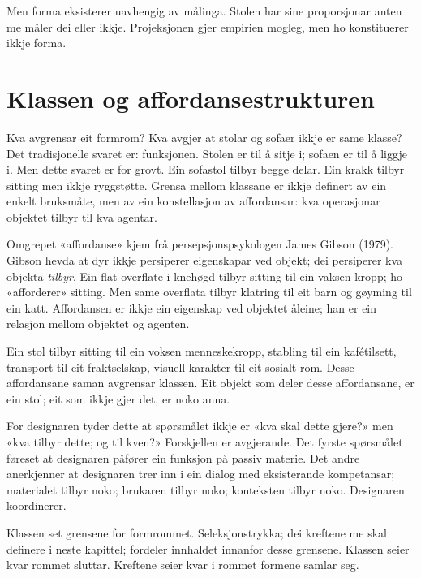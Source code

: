 Men forma eksisterer uavhengig av målinga. Stolen har sine proporsjonar anten me måler dei eller ikkje. Projeksjonen gjer empirien mogleg, men ho konstituerer ikkje forma.

\section*{Klassen og affordansestrukturen}


Kva avgrensar eit formrom? Kva avgjer at stolar og sofaer ikkje er same klasse? Det tradisjonelle svaret er: funksjonen. Stolen er til å sitje i; sofaen er til å liggje i. Men dette svaret er for grovt. Ein sofastol tilbyr begge delar. Ein krakk tilbyr sitting men ikkje ryggstøtte. Grensa mellom klassane er ikkje definert av ein enkelt bruksmåte, men av ein konstellasjon av affordansar: kva operasjonar objektet tilbyr til kva agentar.

Omgrepet «affordanse» kjem frå persepsjonspsykologen James Gibson (1979). Gibson hevda at dyr ikkje persiperer eigenskapar ved objekt; dei persiperer kva objekta \textit{tilbyr}. Ein flat overflate i knehøgd tilbyr sitting til ein vaksen kropp; ho «afforderer» sitting. Men same overflata tilbyr klatring til eit barn og gøyming til ein katt. Affordansen er ikkje ein eigenskap ved objektet åleine; han er ein relasjon mellom objektet og agenten.

Ein stol tilbyr sitting til ein voksen menneskekropp, stabling til ein kafétilsett, transport til eit fraktselskap, visuell karakter til eit sosialt rom. Desse affordansane saman avgrensar klassen. Eit objekt som deler desse affordansane, er ein stol; eit som ikkje gjer det, er noko anna.

For designaren tyder dette at spørsmålet ikkje er «kva skal dette gjere?» men «kva tilbyr dette; og til kven?» Forskjellen er avgjerande. Det fyrste spørsmålet føreset at designaren påfører ein funksjon på passiv materie. Det andre anerkjenner at designaren trer inn i ein dialog med eksisterande kompetansar; materialet tilbyr noko; brukaren tilbyr noko; konteksten tilbyr noko. Designaren koordinerer.

Klassen set grensene for formrommet. Seleksjonstrykka; dei kreftene me skal definere i neste kapittel; fordeler innhaldet innanfor desse grensene. Klassen seier kvar rommet sluttar. Kreftene seier kvar i rommet formene samlar seg.

